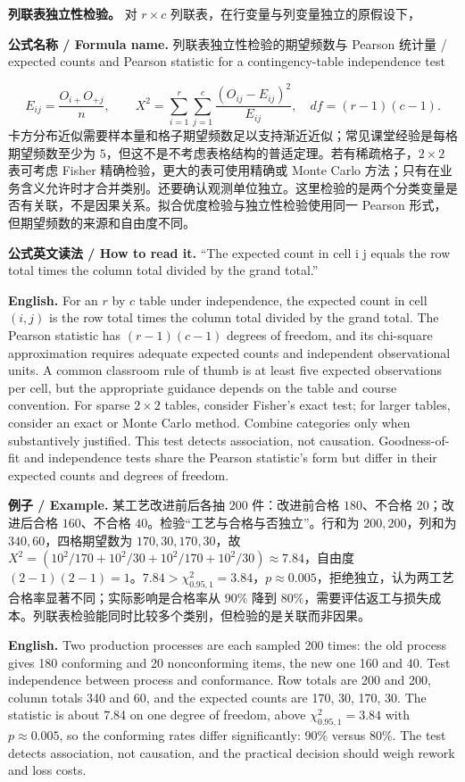 \documentclass[UTF8,11pt,a4paper]{ctexart}
\newcommand{\EN}[1]{\par\noindent\textbf{English.} #1\par}
\newcommand{\READ}[1]{\par\noindent\textbf{公式英文读法 / How to read it.} #1\par}
\newcommand{\FORMULA}[2]{\par\noindent\textbf{公式名称 / Formula name.} #1 / #2\par}
\newcommand{\EX}[2]{\par\noindent\textbf{例子 / Example.} #1\par\EN{#2}}
\begin{document}
\noindent\textbf{列联表独立性检验。} 对 $r\times c$ 列联表，在行变量与列变量独立的原假设下，
\FORMULA{列联表独立性检验的期望频数与 Pearson 统计量}{expected counts and Pearson statistic for a contingency-table independence test}
\[
E_{ij}=\frac{O_{i+}O_{+j}}{n},\qquad
X^2=\sum_{i=1}^r\sum_{j=1}^c\frac{(O_{ij}-E_{ij})^2}{E_{ij}},
\quad df=(r-1)(c-1).
\]
卡方分布近似需要样本量和格子期望频数足以支持渐近近似；常见课堂经验是每格期望频数至少为 $5$，但这不是不考虑表格结构的普适定理。若有稀疏格子，$2\times2$ 表可考虑 Fisher 精确检验，更大的表可使用精确或 Monte Carlo 方法；只有在业务含义允许时才合并类别。还要确认观测单位独立。这里检验的是两个分类变量是否有关联，不是因果关系。拟合优度检验与独立性检验使用同一 Pearson 形式，但期望频数的来源和自由度不同。
\READ{“The expected count in cell i j equals the row total times the column total divided by the grand total.”}
\EN{For an $r$ by $c$ table under independence, the expected count in cell $(i,j)$ is the row total times the column total divided by the grand total. The Pearson statistic has $(r-1)(c-1)$ degrees of freedom, and its chi-square approximation requires adequate expected counts and independent observational units. A common classroom rule of thumb is at least five expected observations per cell, but the appropriate guidance depends on the table and course convention. For sparse $2\times2$ tables, consider Fisher's exact test; for larger tables, consider an exact or Monte Carlo method. Combine categories only when substantively justified. This test detects association, not causation. Goodness-of-fit and independence tests share the Pearson statistic's form but differ in their expected counts and degrees of freedom.}

\EX{某工艺改进前后各抽 $200$ 件：改进前合格 $180$、不合格 $20$；改进后合格 $160$、不合格 $40$。检验“工艺与合格与否独立”。行和为 $200,200$，列和为 $340,60$，四格期望数为 $170,30,170,30$，故 $X^2=(10^2/170+10^2/30+10^2/170+10^2/30)\approx7.84$，自由度 $(2-1)(2-1)=1$。$7.84>\chi^2_{0.95,1}=3.84$，$p\approx0.005$，拒绝独立，认为两工艺合格率显著不同；实际影响是合格率从 $90\%$ 降到 $80\%$，需要评估返工与损失成本。列联表检验能同时比较多个类别，但检验的是关联而非因果。}{Two production processes are each sampled 200 times: the old process gives 180 conforming and 20 nonconforming items, the new one 160 and 40. Test independence between process and conformance. Row totals are 200 and 200, column totals 340 and 60, and the expected counts are 170, 30, 170, 30. The statistic is about 7.84 on one degree of freedom, above $\chi^2_{0.95,1}=3.84$ with $p\approx0.005$, so the conforming rates differ significantly: 90\% versus 80\%. The test detects association, not causation, and the practical decision should weigh rework and loss costs.}
\end{document}
